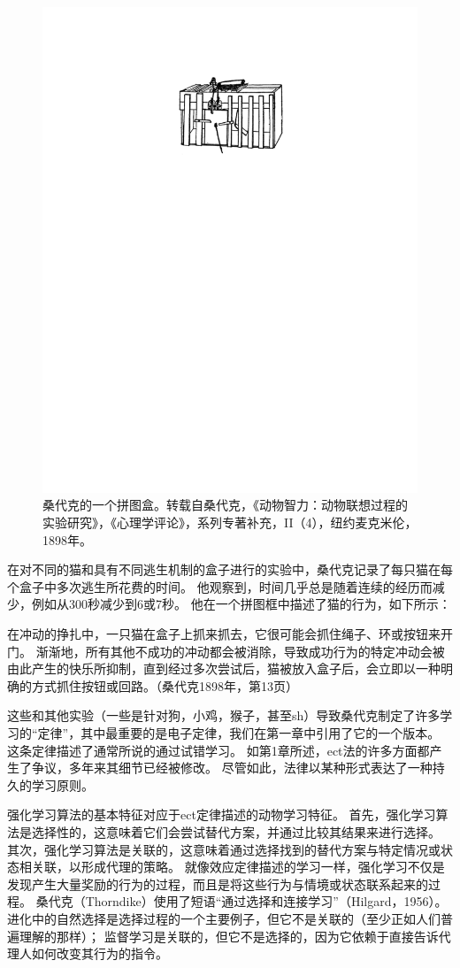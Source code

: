 {\begin{figure}[!htb]
	\centering
	\includegraphics[width=0.5\linewidth]{chap11/fig_11_7}
	\caption{桑代克的一个拼图盒。转载自桑代克，《动物智力：动物联想过程的实验研究》，《心理学评论》，系列专著补充，II（4），纽约麦克米伦，1898年。  \label{fig:11_7}}
\end{figure}

在对不同的猫和具有不同逃生机制的盒子进行的实验中，桑代克记录了每只猫在每个盒子中多次逃生所花费的时间。
他观察到，时间几乎总是随着连续的经历而减少，例如从300秒减少到6或7秒。
他在一个拼图框中描述了猫的行为，如下所示：


在冲动的挣扎中，一只猫在盒子上抓来抓去，它很可能会抓住绳子、环或按钮来开门。
渐渐地，所有其他不成功的冲动都会被消除，导致成功行为的特定冲动会被由此产生的快乐所抑制，直到经过多次尝试后，猫被放入盒子后，会立即以一种明确的方式抓住按钮或回路。（桑代克1898年，第13页）


这些和其他实验（一些是针对狗，小鸡，猴子，甚至sh）导致桑代克制定了许多学习的“定律”，其中最重要的是电子定律，我们在第一章中引用了它的一个版本。
这条定律描述了通常所说的通过试错学习。
如第1章所述，ect法的许多方面都产生了争议，多年来其细节已经被修改。
尽管如此，法律以某种形式表达了一种持久的学习原则。


强化学习算法的基本特征对应于ect定律描述的动物学习特征。
首先，强化学习算法是选择性的，这意味着它们会尝试替代方案，并通过比较其结果来进行选择。
其次，强化学习算法是关联的，这意味着通过选择找到的替代方案与特定情况或状态相关联，以形成代理的策略。
就像效应定律描述的学习一样，强化学习不仅是发现产生大量奖励的行为的过程，而且是将这些行为与情境或状态联系起来的过程。
桑代克（Thorndike）使用了短语“通过选择和连接学习”（Hilgard，1956）。
进化中的自然选择是选择过程的一个主要例子，但它不是关联的（至少正如人们普遍理解的那样）；
监督学习是关联的，但它不是选择的，因为它依赖于直接告诉代理人如何改变其行为的指令。


}
